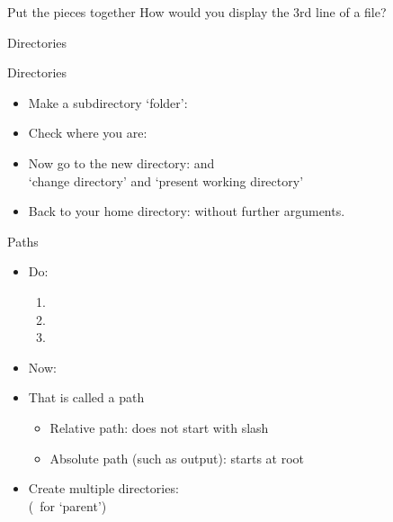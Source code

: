 \documentclass[11pt,headernav]{beamer}
\begin{document}


\begin{exercise}{Put the pieces together}
  How would you display the 3rd line of a file?
\end{exercise}

 {Directories}

\begin{numberedframe}{Directories}
  \label{sl-lnx:cd}
  \begin{itemize}
  \item Make a subdirectory `folder': 
  \item Check where you are: 
  \item Now go to the new directory:  and \\
    `change directory' and `present working directory'
  \item Back to your home directory:  without further arguments.
  \end{itemize}
\end{numberedframe}


\begin{numberedframe}{Paths}
  \label{sl-lnx:path}
  \begin{itemize}
  \item Do:
    \begin{enumerate}
    \item {} \item {} \item {}
    \end{enumerate}
  \item Now: 
  \item That is called a path
    \begin{itemize}
    \item Relative path: does not start with slash
    \item Absolute path (such as  output): starts at root
    \end{itemize}
  \item Create multiple directories:\\
     (~for `parent')
  \end{itemize}
\end{numberedframe}
\end{document}

